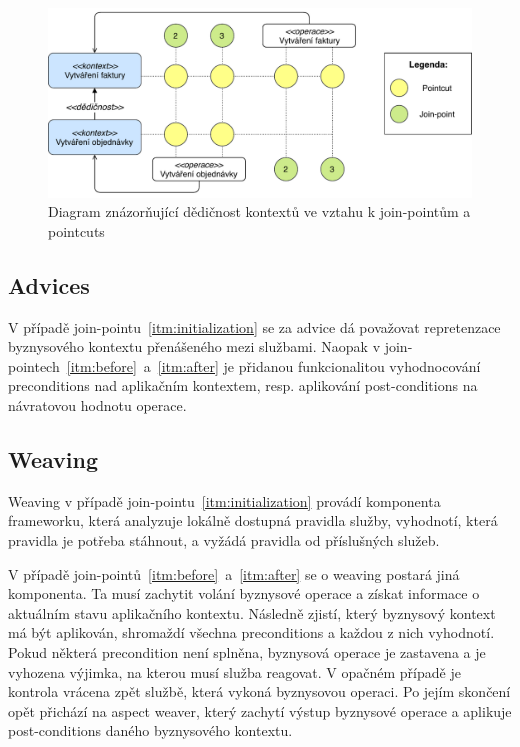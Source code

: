 \begin{figure}
    \centering
    \includegraphics[keepaspectratio=true, width=1\linewidth]{figures/context-extension.pdf}
    \caption{Diagram znázorňující dědičnost kontextů ve vztahu k join-pointům a pointcuts}
    \label{fig:context-extension}
\end{figure}

\subsection{Advices}

V případě join-pointu~\ref{itm:initialization} se za advice dá považovat repretenzace byznysového
kontextu přenášeného mezi službami. Naopak v join-pointech~\ref{itm:before}~a~\ref{itm:after}
je přidanou funkcionalitou vyhodnocování preconditions nad aplikačním kontextem, resp. aplikování
post-conditions na návratovou hodnotu operace.

\subsection{Weaving}

Weaving v případě join-pointu~\ref{itm:initialization} provádí komponenta frameworku, která
analyzuje lokálně dostupná pravidla služby, vyhodnotí, která pravidla je potřeba stáhnout,
a vyžádá pravidla od příslušných služeb.

V případě join-pointů~\ref{itm:before}~a~\ref{itm:after} se o weaving postará jiná komponenta.
Ta musí zachytit volání byznysové operace a získat informace o aktuálním stavu aplikačního kontextu.
Následně zjistí, který byznysový kontext má být aplikován, shromaždí všechna preconditions
a každou z nich vyhodnotí. Pokud některá precondition není splněna, byznysová operace je zastavena
a je vyhozena výjimka, na kterou musí služba reagovat. V opačném případě je kontrola vrácena zpět
službě, která vykoná byznysovou operaci. Po jejím skončení opět přichází na aspect weaver, který
zachytí výstup byznysové operace a aplikuje post-conditions daného byznysového kontextu.

